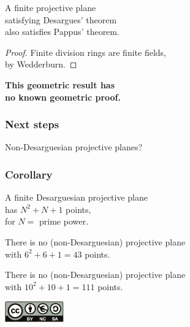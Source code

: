 \documentclass[14pt]{chalkfjord}
\newcommand{\clearbackgroundpicture}{\usebackgroundtemplate{}}
\begin{document}
\begin{frame}
  \begin{theorem}
    A finite projective plane \\
    \quad satisfying Desargues' theorem \\
    \quad also satisfies Pappus' theorem.
  \end{theorem}
  \pause
  \begin{proof}
    Finite division rings are finite fields,\\
    \quad by Wedderburn.
  \end{proof}
  \pause
  \vfill
  \textbf{This geometric result has\\
    \quad no known geometric proof.}

\end{frame}

\begin{frame}
  \frametitle{Next steps}

  \vfill

  \begin{center}
    Non-Desarguesian projective planes?
  \end{center}
  
  \vfill
\end{frame}

\begin{frame}
  \frametitle{Corollary}

  A finite Desarguesian projective plane \\
  \quad has $N^2 + N + 1$ points,\\
  \quad for $N = $ prime power.

  \vfill\pause

  \begin{theorem}
    There is no (non-Desarguesian) projective plane \\
    \quad with $6^2 + 6 + 1 = 43$ points.
  \end{theorem}

  \vfill\pause

  \begin{theorem}[Computer]
    There is no (non-Desarguesian) projective plane \\
    \quad with $10^2 + 10 + 1 = 111$ points.
  \end{theorem}

\end{frame}


 \clearbackgroundpicture
 \begin{frame}[nofills,label=thanks]
   \vfill
   \begin{center}
   \Huge
   \end{center}
   \vfill
   \includegraphics[width=1in]{cc-logo.pdf}
   \hfill\footnotesize{}
   \null
 \end{frame}
\end{document}
